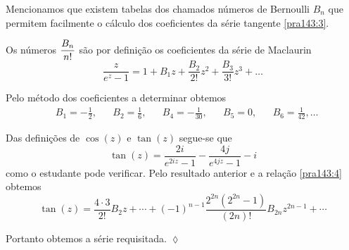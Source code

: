 Mencionamos que existem tabelas dos chamados n\'{u}meros de Bernoulli
$B_n$ que permitem facilmente o c\'{a}lculo dos coeficientes da s\'{e}rie tangente
\eqref{pra143:3}.

Os n\'{u}meros $\displaystyle{\frac{B_n}{n!}}$ s\~{a}o por defini\c{c}\~{a}o os
coeficientes da s\'{e}rie de Maclaurin
\begin{equation}\label{pra143:4}
\frac{z}{e^z-1} = 1 + B_1z + \frac{B_2}{2!}z^2 +
\frac{B_3}{3!}z^3+\ldots
\end{equation}

Pelo m\'{e}todo dos coeficientes a determinar obtemos
\begin{align}\label{pra143:5}
&B_1=-\frac{1}{2},&&  B_2= \frac{1}{6},&&
B_4=-\frac{1}{30}, &&  B_5=0, && B_6=\frac{1}{42},\ldots
\end{align}

Das defini\c{c}\~{o}es de $\cos(z)$ e $\tan(z)$  segue-se que
\begin{equation*}
  \tan(z) = \frac{2i}{e^{2iz}-1}- \frac{4j}{e^{4jz}-1}-i
\end{equation*}
como o estudante pode verificar. Pelo resultado anterior  e a rela\c{c}\~{a}o \eqref{pra143:4} obtemos
\begin{equation}\label{pra143:6}
\tan(z)= \frac{4\cdot
3}{2!}B_2z+\cdots+(-1)^{n-1}\frac{2^{2n}(2^{2n}-1)}{(2n)!}B_{2n}z^{2n-1}+\cdots
\end{equation}

Portanto obtemos a s\'{e}rie requisitada. \hfill \(\lozenge\)

